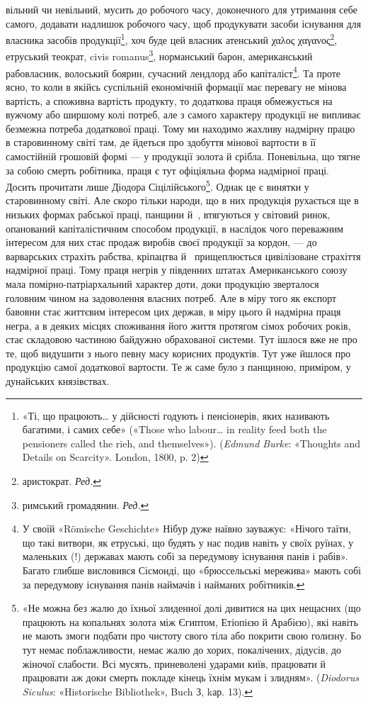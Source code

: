 \parcont{}  %
вільний чи невільний, мусить до робочого часу, доконечного для
утримання себе самого, додавати надлишок робочого часу, щоб
продукувати засоби існування для власника засобів продукції\footnote{
«Ті, що працюють\dots{} у дійсності годують і пенсіонерів, яких називають
багатими, і самих себе» («Those who labour\dots{} in reality feed both
the pensioners called the rieh, and themselves»). (\emph{Edmund Burke}: «Thoughts and
Details on Scarcity». London, 1800, p. 2)
},
хоч буде цей власник атенський \textgreek{χαλος χαγανος}\footnote*{
аристократ. \emph{Ред.}
}, етруський теократ,
civis romanus\footnote*{римський громадянин. \emph{Ред.}},
норманський барон, американський рабовласник,
волоський боярин, сучасний лендлорд або капіталіст\footnote{
У своїй «Römische Geschichte» Нібур дуже наївно зауважує: «Нічого
таїти, що такі витвори, як етруські, що будять у нас подив навіть у
своїх руїнах, у маленьких (!) державах мають собі за передумову існування
панів і рабів». Багато глибше висловився Сісмонді, що «брюссельські
мережива» мають собі за передумову існування панів наймачів і найманих
робітників.
}.
Та проте ясно, то коли в якійсь суспільній економічній формації
має перевагу не мінова вартість, а споживна вартість продукту,
то додаткова праця обмежується на вужчому або ширшому колі
потреб, але з самого характеру продукції не випливає безмежна
потреба додаткової праці. Тому ми находимо жахливу надмірну
працю в старовинному світі там, де йдеться про здобуття мінової
вартости в її самостійній грошовій формі — у продукції золота
й срібла. Поневільна, що тягне за собою смерть робітника, праця
є тут офіціяльна форма надмірної праці. Досить прочитати лише
Діодора Сіцілійського\footnote{
«Не можна без жалю до їхньої злиденної долі дивитися на цих нещасних
(що працюють на копальнях золота між Єгиптом, Етіопією й
Арабією), які навіть не мають змоги подбати про чистоту свого тіла або
покрити свою голизну. Бо тут немає поблажливости, немає жалю до
хорих, покалічених, дідусів, до жіночої слабости. Всі мусять, приневолені
ударами київ, працювати й працювати аж доки смерть покладе кінець
їхнім мукам і злидням». (\emph{Diodorus Siculus}: «Historische Bibliothek», Buch З,
kар. 13).
}. Однак це є винятки у старовинному
світі. Але скоро тільки народи, що в них продукція рухається
ще в низьких формах рабської праці, панщини й~, втягуються
у світовий ринок, опанований капіталістичним способом продукції,
в наслідок чого переважним інтересом для них стає продаж виробів
своєї продукції за кордон, — до варварських страхіть рабства,
кріпацтва й~ прищеплюється цивілізоване страхіття надмірної
праці. Тому праця негрів у південних штатах Американського
союзу мала помірно-патріархальний характер доти, доки продукцію
зверталося головним чином на задоволення власних потреб.
Але в міру того як експорт бавовни стає життєвим інтересом цих
держав, в міру цього й надмірна праця негра, а в деяких місцях
споживання його життя протягом сімох робочих років, стає складовою
частиною байдужно обрахованої системи. Тут ішлося вже
не про те, щоб видушити з нього певну масу корисних продуктів.
Тут уже йшлося про продукцію самої додаткової вартости. Те ж
саме було з панщиною, приміром, у дунайських князівствах.
